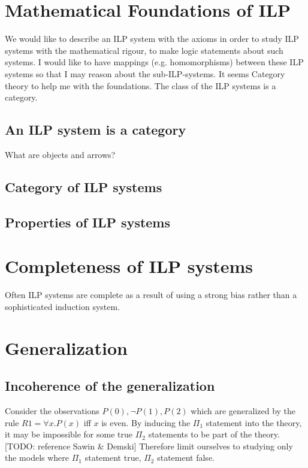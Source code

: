 \section{Mathematical Foundations of ILP}
We would like to describe an ILP system with the axioms in order to study ILP systems with the mathematical rigour, to make logic statements about such systems.
I would like to have mappings (e.g. homomorphisms) between these ILP systems so that I may reason about the sub-ILP-systems. It seems Category theory to help me with the foundations. The class of the ILP systems is a category.
\subsection{An ILP system is a category}
What are objects and arrows?
\subsection{Category of ILP systems}

\subsection{Properties of ILP systems}

\subsection{}
\subsection{}
\section{Completeness of ILP systems}
Often ILP systems are complete as a result of using a strong bias rather than a sophisticated induction system.
\fi
\section{Generalization}
\subsection{Incoherence of the generalization}
Consider the observations $P(0), \neg P(1), P(2)$ which are generalized by the rule $R1=\forall x. P(x)$ iff $x$ is even.
By inducing the $\Pi_1$ statement into the theory, it may be impossible for some true $\Pi_2$ statements to be part of the theory. [TODO: reference Sawin \& Demski]
Therefore limit ourselves to studying only the models where $\Pi_1$ statement true, $\Pi_2$ statement false.
\iffalse
